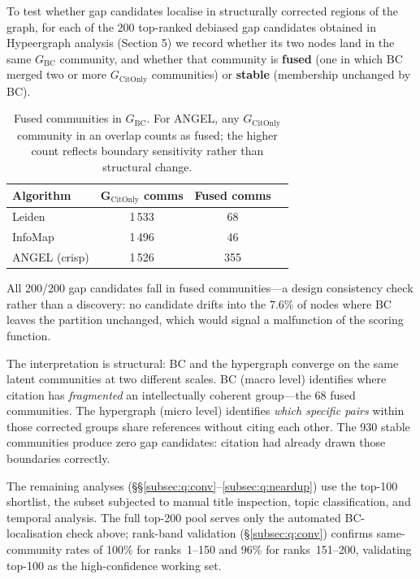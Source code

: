 To test whether gap candidates localise in structurally corrected regions of the graph, for each of the 200 top-ranked debiased gap candidates obtained in Hypeergraph analysis (Section 5) we record whether its two nodes land in the same $G_\text{BC}$ community, and whether that community is \textbf{fused} (one in which BC merged two or more $G_\text{CitOnly}$ communities) or \textbf{stable} (membership unchanged by BC).

\begin{table}[h]
\centering
\begin{tabular}{lccc}
\toprule
Algorithm & G$_\text{CitOnly}$ comms & Fused comms \\
\midrule
Leiden & 1\,533 & 68   \\
InfoMap & 1\,496 & 46   \\
ANGEL (crisp) & 1\,526 & 355  \\
\bottomrule
\end{tabular}
\smallskip
\caption{Fused communities in $G_\text{BC}$. For ANGEL, any $G_\text{CitOnly}$ community in an overlap counts as fused; the higher count reflects boundary sensitivity rather than structural change.}
\label{tab:bccorr}
\end{table}


All 200/200 gap candidates fall in fused communities---a design consistency check rather than a discovery: no candidate drifts into the 7.6\% of nodes where BC leaves the partition unchanged, which would signal a malfunction of the scoring function.

The interpretation is structural: BC and the hypergraph converge on the same latent communities at two different scales.  BC (macro level) identifies where citation has \emph{fragmented} an intellectually coherent group---the 68 fused communities.  The hypergraph (micro level) identifies \emph{which specific pairs} within those corrected groups share references without citing each other.  %
The 930 stable communities produce zero gap candidates: citation had already drawn those boundaries correctly.

The remaining analyses (§§\ref{subsec:q:conv}--\ref{subsec:q:neardup}) use the top-100 shortlist, the subset subjected to manual title inspection, topic classification, and temporal analysis.  The full top-200 pool serves only the automated BC-localisation check above; rank-band validation (\S\ref{subsec:q:conv}) confirms same-community rates of 100\% for ranks~1--150 and 96\% for ranks~151--200, validating top-100 as the high-confidence working set.

